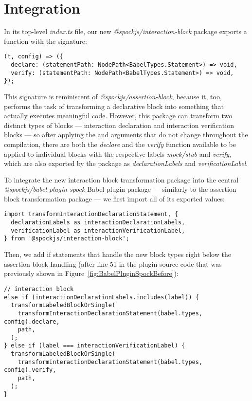 \section{Integration}
In its top-level \textit{index.ts} file,
our new \textit{@spockjs/interaction-block} package
exports a function with the signature:
\begin{verbatim}
(t, config) => ({
  declare: (statementPath: NodePath<BabelTypes.Statement>) => void,
  verify: (statementPath: NodePath<BabelTypes.Statement>) => void,
});
\end{verbatim}

This signature is reminiscent of \textit{@spockjs/assertion-block},
because it, too, performs the task of transforming a declarative block into
something that actually executes meaningful code.
However, this package can transform two distinct types of blocks
--- interaction declaration and interaction verification blocks ---
so after applying the  and  arguments
that do not change throughout the compilation,
there are both the \textit{declare} and the \textit{verify} function available
to be applied to individual blocks with the
respective labels \textit{mock/stub} and \textit{verify},
which are also exported by the package as
\textit{declarationLabels} and \textit{verificationLabel}.

To integrate the new interaction block transformation package into the
central \textit{@spockjs/babel-plugin-spock} Babel plugin package
--- similarly to the assertion block transformation package ---
we first import all of its exported values:
\begin{verbatim}
import transformInteractionDeclarationStatement, {
  declarationLabels as interactionDeclarationLabels,
  verificationLabel as interactionVerificationLabel,
} from '@spockjs/interaction-block';
\end{verbatim}
Then, we add if statements that handle the new block types
right below the assertion block handling
(after line 51 in the plugin source code that was
previously shown in Figure~\ref{fig:BabelPluginSpockBefore}):
\begin{verbatim}
// interaction block
else if (interactionDeclarationLabels.includes(label)) {
  transformLabeledBlockOrSingle(
    transformInteractionDeclarationStatement(babel.types, config).declare,
    path,
  );
} else if (label === interactionVerificationLabel) {
  transformLabeledBlockOrSingle(
    transformInteractionDeclarationStatement(babel.types, config).verify,
    path,
  );
}
\end{verbatim}
